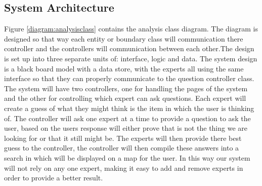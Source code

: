 \documentclass[titlepage]{article}
\begin{document}
\subsection{System Architecture}

Figure \ref{diagram:analysisclass} contains the analysis class diagram. The diagram is designed so that way each entity or boundary class will communication there controller and the controllers will communication between each other.The design is set up into three separate units of: interface, logic and data. The system design is a black board model with a data store, with the experts all using the same interface so that they can properly communicate to the question controller class. The system will have two controllers, one for handling the pages of the system and the other for controlling which expert can ask questions. Each expert will create a guess of what they might think is the item in which the user is thinking of. The controller will ask one expert at a time to provide a question to ask the user, based on the users response will either prove that is not the thing we are looking for or that it still might be. The experts will then provide there best guess to the controller, the controller will then compile these answers into a search in which will be displayed on a map for the user. In this way our system will not rely on any one expert, making it easy to add and remove experts in order to provide a better result.
\end{document}
